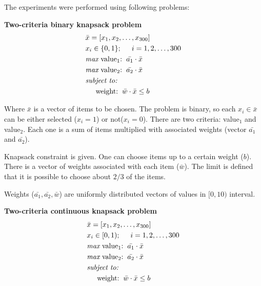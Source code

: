 The experiments were performed using following problems:
\begin{description}
  \item{\textbf{Two-criteria binary knapsack problem}}
    \begin{align*}
      & \bar{x} = [x_1, x_2, \dots, x_{300}]  \\
      & x_i \in \{0, 1\};  \hspace{0.5cm} i = 1, 2, \dots, 300 \\
      & \textit{max}\text{ value$_1$:} \hspace{0.2cm} \bar{a_1} \cdot \bar{x} \\
      & \textit{max}\text{ value$_2$:} \hspace{0.2cm} \bar{a_2} \cdot \bar{x} \\
      & \textit{subject to:} \\
      & \hspace{0.5cm} \text{weight:} \hspace{0.2cm} \bar{w} \cdot \bar{x} \leq b
    \end{align*}
    
    Where $\bar{x}$ is a vector of items to be chosen. The problem is binary,
    so each $x_i \in \bar{x}$ can be either selected ($x_i = 1$) or not($x_i
    = 0$). There are two criteria: value$_1$ and value$_2$. Each one is a sum
    of items multiplied with associated weights (vector $\bar{a_1}$ and
    $\bar{a_2}$).

    Knapsack constraint is given. One can choose items up to a certain weight
    ($b$). There is a vector of weights associated with each item
    ($\bar{w}$). The limit is defined that it is possible to choose about
    $2/3$ of the items.

    Weights ($\bar{a_1}, \bar{a_2}, \bar{w}$) are uniformly distributed
    vectors of values in $[0,10)$ interval.


  \item{\textbf{Two-criteria continuous knapsack problem}}
    \begin{align*}
      & \bar{x} = [x_1, x_2, \dots, x_{300}]  \\
      & x_i \in [0, 1);  \hspace{0.5cm} i = 1, 2, \dots, 300 \\
      & \textit{max}\text{ value$_1$:} \hspace{0.2cm} \bar{a_1} \cdot \bar{x} \\
      & \textit{max}\text{ value$_2$:} \hspace{0.2cm} \bar{a_2} \cdot \bar{x} \\
      & \textit{subject to:} \\
      & \hspace{0.5cm} \text{weight:}  \hspace{0.2cm} \bar{w} \cdot \bar{x} \leq b
    \end{align*}


\end{description}
